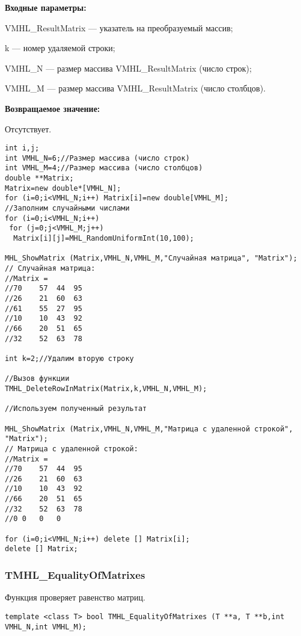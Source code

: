 \documentclass[a4paper,12pt]{article}
\begin{document}
\textbf{Входные параметры:}  
 
VMHL\_ResultMatrix --- указатель на преобразуемый массив;
 
k --- номер удаляемой строки;
 
VMHL\_N --- размер массива VMHL\_ResultMatrix (число строк);
 
VMHL\_M --- размер массива VMHL\_ResultMatrix (число столбцов).

\textbf{Возвращаемое значение:}

Отсутствует.


\begin{lstlisting}[label=code_use_TMHL_DeleteRowInMatrix,caption=Пример использования]
int i,j;
int VMHL_N=6;//Размер массива (число строк)
int VMHL_M=4;//Размер массива (число столбцов)
double **Matrix;
Matrix=new double*[VMHL_N];
for (i=0;i<VMHL_N;i++) Matrix[i]=new double[VMHL_M];
//Заполним случайными числами
for (i=0;i<VMHL_N;i++)
 for (j=0;j<VMHL_M;j++)
  Matrix[i][j]=MHL_RandomUniformInt(10,100);

MHL_ShowMatrix (Matrix,VMHL_N,VMHL_M,"Случайная матрица", "Matrix");
// Случайная матрица:
//Matrix =
//70	57	44	95
//26	21	60	63
//61	55	27	95
//10	10	43	92
//66	20	51	65
//32	52	63	78

int k=2;//Удалим вторую строку

//Вызов функции
TMHL_DeleteRowInMatrix(Matrix,k,VMHL_N,VMHL_M);

//Используем полученный результат

MHL_ShowMatrix (Matrix,VMHL_N,VMHL_M,"Матрица с удаленной строкой", "Matrix");
// Матрица с удаленной строкой:
//Matrix =
//70	57	44	95
//26	21	60	63
//10	10	43	92
//66	20	51	65
//32	52	63	78
//0	0	0	0

for (i=0;i<VMHL_N;i++) delete [] Matrix[i];
delete [] Matrix;
\end{lstlisting}

\subsubsection{TMHL\_EqualityOfMatrixes}\label{TMHL_EqualityOfMatrixes}

Функция проверяет равенство матриц.


\begin{lstlisting}[label=code_syntax_TMHL_EqualityOfMatrixes,caption=Синтаксис]
template <class T> bool TMHL_EqualityOfMatrixes (T **a, T **b,int VMHL_N,int VMHL_M);
\end{lstlisting}
\end{document}
